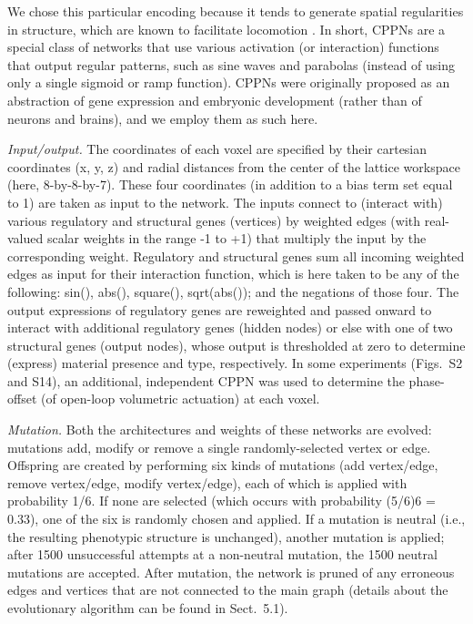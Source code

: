 We chose this particular encoding because it tends to generate spatial regularities in structure, which are known to facilitate locomotion \cite{clune2009evolving}. 
In short, CPPNs are a special class of networks that use various activation (or interaction) functions that output regular patterns, such as sine waves and parabolas (instead of using only a single sigmoid or ramp function). 
CPPNs were originally proposed \cite{stanley2007compositional} as an abstraction of gene expression and embryonic development (rather than of neurons and brains), and we employ them as such here.

\textit{Input/output.}  The coordinates of each voxel are specified by their cartesian coordinates (x, y, z) and radial distances from the center of the lattice workspace (here, 8-by-8-by-7). 
These four coordinates (in addition to a bias term set equal to 1) are taken as input to the network. 
The inputs connect to (interact with) various regulatory and structural genes (vertices) by weighted edges (with real-valued scalar weights in the range -1 to +1) that multiply the input by the corresponding weight. Regulatory and structural genes sum all incoming weighted edges as input for their interaction function, which is here taken to be any of the following: sin(), abs(), square(), sqrt(abs()); and the negations of those four. 
The output expressions of regulatory genes are reweighted and passed onward to interact with additional regulatory genes (hidden nodes) or else with one of two structural genes (output nodes), whose output is thresholded at zero to determine (express) material presence and type, respectively. 
In some experiments (Figs.~S2 and S14), an additional, independent CPPN was used to determine the phase-offset (of open-loop volumetric actuation) at each voxel.

\textit{Mutation.}  Both the architectures and weights of these networks are evolved: mutations add, modify or remove a single randomly-selected vertex or edge. 
Offspring are created by performing six kinds of mutations (add vertex/edge, remove vertex/edge, modify vertex/edge), each of which is applied with probability 1/6. 
If none are selected (which occurs with probability (5/6)6 = 0.33), one of the six is randomly chosen and applied. 
If a mutation is neutral (i.e., the resulting phenotypic structure is unchanged), another mutation is applied; after 1500 unsuccessful attempts at a non-neutral mutation, the 1500 neutral mutations are accepted. 
After mutation, the network is pruned of any erroneous edges and vertices that are not connected to the main graph (details about the evolutionary algorithm can be found in Sect.~5.1).

